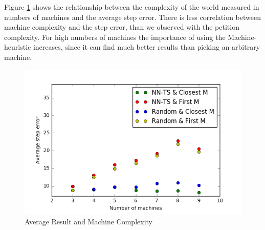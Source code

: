 Figure \ref{fig:abc4} shows the relationship between the complexity of the world measured in numbers of machines and the average step error. There is less correlation between machine complexity and the step error, than we observed with the petition complexity. For high numbers of machines the importance of using the Machine-heuristic increases, since it can find much better results than picking an arbitrary machine. 

\begin{figure}[!hbt]
  \includegraphics[width=1\textwidth]{img/avg_error_vs_machines}
  \caption{Average Result and Machine Complexity}
  \label{fig:abc4}
\end{figure}

